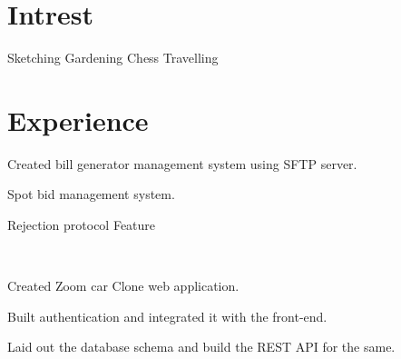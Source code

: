 \documentclass[]{deedy-resume-openfont}
\begin{document}
\begin{minipage}[t]{0.43\textwidth}
\vspace{5pt}
\section{Intrest}
\textbullet{} Sketching
\textbullet{} Gardening
\textbullet{} Chess
\textbullet{} Travelling

%
%

\end{minipage} 
\hfill
\begin{minipage}[t]{0.56\textwidth} 


\section{Experience}
\vspace{\topsep}
\begin{tightemize}
\item Created bill generator management system using SFTP server. 
\item Spot bid management system.
\item Rejection protocol Feature 
\end{tightemize}
\ \ \ \ \ \ 
\sectionsep

\begin{tightemize}
\item Created Zoom car Clone web application.
\item Built authentication and integrated it with the front-end.
\item Laid out the database schema and build the REST API for the same.
\end{tightemize}
\ \ \ \ \ \ 


\end{minipage}
\end{document}
